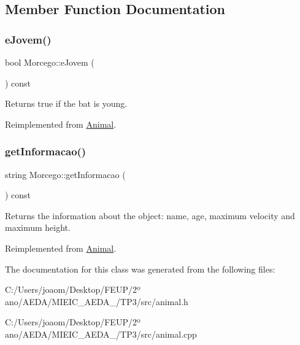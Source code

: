 \subsection{Member Function Documentation}
\mbox{\label{class_morcego_a529bc1b0f9557b0b015dd517bad62ebc}} 
\subsubsection{\texorpdfstring{e\+Jovem()}{eJovem()}}
{\footnotesize\ttfamily bool Morcego\+::e\+Jovem (\begin{DoxyParamCaption}{ }\end{DoxyParamCaption}) const\hspace{0.3cm}{\ttfamily [virtual]}}

Returns true if the bat is young. 

Reimplemented from \mbox{\hyperlink{class_animal_a13862612b8bcf972d764b0ef81b66324}{Animal}}.

\mbox{\label{class_morcego_a8dd752e35a5e37bda4d27b0eeb72912b}} 
\subsubsection{\texorpdfstring{get\+Informacao()}{getInformacao()}}
{\footnotesize\ttfamily string Morcego\+::get\+Informacao (\begin{DoxyParamCaption}{ }\end{DoxyParamCaption}) const\hspace{0.3cm}{\ttfamily [virtual]}}

Returns the information about the object\+: name, age, maximum velocity and maximum height. 

Reimplemented from \mbox{\hyperlink{class_animal_aee82faf16789092dc1fde106382e2b18}{Animal}}.



The documentation for this class was generated from the following files\+:\begin{DoxyCompactItemize}
\item 
C\+:/\+Users/joaom/\+Desktop/\+F\+E\+U\+P/2º ano/\+A\+E\+D\+A/\+M\+I\+E\+I\+C\+\_\+\+A\+E\+D\+A\+\_/\+T\+P3/src/animal.\+h\item 
C\+:/\+Users/joaom/\+Desktop/\+F\+E\+U\+P/2º ano/\+A\+E\+D\+A/\+M\+I\+E\+I\+C\+\_\+\+A\+E\+D\+A\+\_/\+T\+P3/src/animal.\+cpp\end{DoxyCompactItemize}

